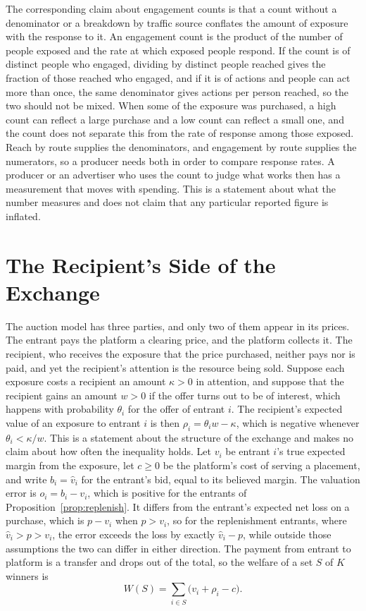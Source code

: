 \documentclass[11pt]{article}
\theoremstyle{definition}
\begin{document}
The corresponding claim about engagement counts is that a count without a denominator or a breakdown by traffic source conflates the amount of exposure with the response to it. An engagement count is the product of the number of people exposed and the rate at which exposed people respond. If the count is of distinct people who engaged, dividing by distinct people reached gives the fraction of those reached who engaged, and if it is of actions and people can act more than once, the same denominator gives actions per person reached, so the two should not be mixed. When some of the exposure was purchased, a high count can reflect a large purchase and a low count can reflect a small one, and the count does not separate this from the rate of response among those exposed. Reach by route supplies the denominators, and engagement by route supplies the numerators, so a producer needs both in order to compare response rates. A producer or an advertiser who uses the count to judge what works then has a measurement that moves with spending. This is a statement about what the number measures and does not claim that any particular reported figure is inflated.

\section{The Recipient's Side of the Exchange}

The auction model has three parties, and only two of them appear in its prices. The entrant pays the platform a clearing price, and the platform collects it. The recipient, who receives the exposure that the price purchased, neither pays nor is paid, and yet the recipient's attention is the resource being sold. Suppose each exposure costs a recipient an amount $\kappa>0$ in attention, and suppose that the recipient gains an amount $w>0$ if the offer turns out to be of interest, which happens with probability $\theta_i$ for the offer of entrant $i$. The recipient's expected value of an exposure to entrant $i$ is then $\rho_i=\theta_i w-\kappa$, which is negative whenever $\theta_i<\kappa/w$. This is a statement about the structure of the exchange and makes no claim about how often the inequality holds. Let $v_i$ be entrant $i$'s true expected margin from the exposure, let $c\ge 0$ be the platform's cost of serving a placement, and write $b_i=\hat v_i$ for the entrant's bid, equal to its believed margin. The valuation error is $o_i=b_i-v_i$, which is positive for the entrants of Proposition~\ref{prop:replenish}. It differs from the entrant's expected net loss on a purchase, which is $p-v_i$ when $p>v_i$, so for the replenishment entrants, where $\hat v_i>p>v_i$, the error exceeds the loss by exactly $\hat v_i-p$, while outside those assumptions the two can differ in either direction. The payment from entrant to platform is a transfer and drops out of the total, so the welfare of a set $S$ of $K$ winners is
\[
W(S)=\sum_{i\in S}\bigl(v_i+\rho_i-c\bigr).
\]
\end{document}
